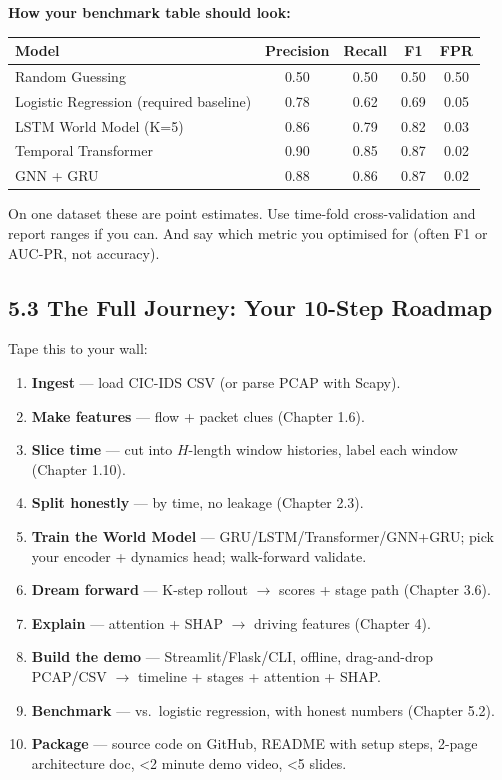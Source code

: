 \documentclass[11pt,a4paper]{article}
\begin{document}
\begin{examplebox}
\textbf{How your benchmark table should look:}

\begin{center}
\small
\begin{tabular}{@{}lcccc@{}}
\toprule
Model & Precision & Recall & F1 & FPR \\
\midrule
Random Guessing & 0.50 & 0.50 & 0.50 & 0.50 \\
Logistic Regression (required baseline) & 0.78 & 0.62 & 0.69 & 0.05 \\
LSTM World Model (K=5) & 0.86 & 0.79 & 0.82 & 0.03 \\
Temporal Transformer & 0.90 & 0.85 & 0.87 & 0.02 \\
GNN + GRU & 0.88 & 0.86 & 0.87 & 0.02 \\
\bottomrule
\end{tabular}
\end{center}

On one dataset these are point estimates. Use time-fold cross-validation and
report ranges if you can. And say which metric you optimised for (often F1
or AUC-PR, not accuracy).
\end{examplebox}

\subsection{5.3 The Full Journey: Your 10-Step Roadmap}
\label{sec:workflow}

Tape this to your wall:

\begin{enumerate}[leftmargin=1.8em,itemsep=2pt]
  \item \textbf{Ingest} --- load CIC-IDS CSV (or parse PCAP with Scapy).
  \item \textbf{Make features} --- flow + packet clues (Chapter 1.6).
  \item \textbf{Slice time} --- cut into $H$-length window histories, label each
        window (Chapter 1.10).
  \item \textbf{Split honestly} --- by time, no leakage (Chapter 2.3).
  \item \textbf{Train the World Model} --- GRU/LSTM/Transformer/GNN+GRU;
        pick your encoder + dynamics head; walk-forward validate.
  \item \textbf{Dream forward} --- K-step rollout $\to$ scores + stage path
        (Chapter 3.6).
  \item \textbf{Explain} --- attention + SHAP $\to$ driving features
        (Chapter 4).
  \item \textbf{Build the demo} --- Streamlit/Flask/CLI, offline, drag-and-drop
        PCAP/CSV $\to$ timeline + stages + attention + SHAP.
  \item \textbf{Benchmark} --- vs.\ logistic regression, with honest numbers
        (Chapter 5.2).
  \item \textbf{Package} --- source code on GitHub, README with setup steps,
        2-page architecture doc, \textless{}2 minute demo video,
        \textless{}5 slides.
\end{enumerate}
\end{document}
